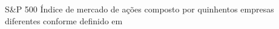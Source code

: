 \begin{siglas}
    \item[S\&P 500] Índice de mercado de ações composto por
                    quinhentos empresas diferentes conforme definido
                    em 
\end{siglas}
